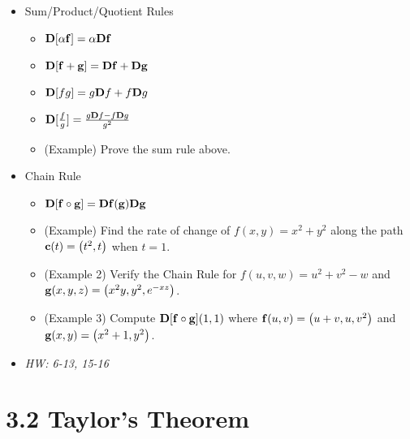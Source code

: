 \documentclass[11pt]{article}
\begin{document}
\begin{itemize}
  \item Sum/Product/Quotient Rules
    \begin{itemize}
      \item \(\mathbf{D}[\alpha \mathbf{f}]=\alpha\mathbf{D}\mathbf{f}\)
      \item \(\mathbf{D}[\mathbf{f}+\mathbf{g}]=\mathbf{D}\mathbf{f}+\mathbf{D}\mathbf{g}\)
      \item
        \(
          \mathbf{D}[fg]=g\mathbf{D}f + f\mathbf{D}g
        \)
      \item
        \(
          \mathbf{D}[\frac{f}{g}]
            =
          \frac{
            g\mathbf{D}f - f\mathbf{D}g
          }{
            g^2
          }
        \)
      \item (Example) Prove the sum rule above.
    \end{itemize}
  \item Chain Rule
    \begin{itemize}
      \item
        \(
          \mathbf{D} [\mathbf{f}\circ \mathbf{g}]
            =
          \mathbf{D}\mathbf{f}(\mathbf{g})\mathbf{D}\mathbf{g}
        \)
      \item
        (Example) Find the rate of change of \(f(x,y)=x^2+y^2\) along
        the path \(\mathbf{c}(t)=\left(t^2,t\right)\) when \(t=1\).
      \item
        (Example 2) Verify the Chain Rule for \(f(u,v,w)=u^2+v^2-w\)
        and \(\mathbf{g}(x,y,z)=\left(x^2y,y^2,e^{-xz}\right)\).
      \item
        (Example 3) Compute \(\mathbf{D}[\mathbf{f}\circ\mathbf{g}](1,1)\) where
        \(\mathbf{f}(u,v)=\left(u+v,u,v^2\right)\) and \(\mathbf{g}(x,y)=\left(x^2+1,y^2\right)\).
    \end{itemize}
  \item\textit{
    HW: 6-13, 15-16
  }
\end{itemize}


\section*{3.2 Taylor's Theorem}
\end{document}
